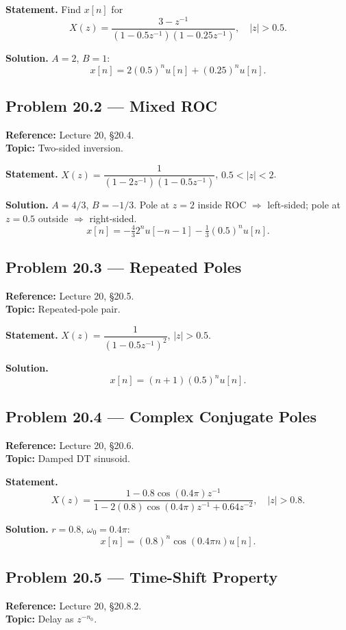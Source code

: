 \documentclass[11pt]{article}
\begin{document}
\textbf{Statement.} Find $x[n]$ for
\[
X(z) = \frac{3-z^{-1}}{(1-0.5z^{-1})(1-0.25z^{-1})},\quad |z|>0.5.
\]

\textbf{Solution.} $A=2$, $B=1$:
\[
\boxed{x[n] = 2(0.5)^n u[n] + (0.25)^n u[n]}.
\]

\subsection{Problem 20.2 --- Mixed ROC}
\textbf{Reference:} Lecture 20, \S 20.4.\\
\textbf{Topic:} Two-sided inversion.

\textbf{Statement.} $X(z) = \dfrac{1}{(1-2z^{-1})(1-0.5z^{-1})}$, $0.5<|z|<2$.

\textbf{Solution.} $A=4/3$, $B=-1/3$. Pole at $z=2$ inside ROC $\Rightarrow$ left-sided; pole at $z=0.5$ outside $\Rightarrow$ right-sided.
\[
\boxed{x[n] = -\tfrac{4}{3}2^n u[-n-1] - \tfrac{1}{3}(0.5)^n u[n]}.
\]

\subsection{Problem 20.3 --- Repeated Poles}
\textbf{Reference:} Lecture 20, \S 20.5.\\
\textbf{Topic:} Repeated-pole pair.

\textbf{Statement.} $X(z) = \dfrac{1}{(1-0.5z^{-1})^2}$, $|z|>0.5$.

\textbf{Solution.}
\[
\boxed{x[n] = (n+1)(0.5)^n u[n]}.
\]

\subsection{Problem 20.4 --- Complex Conjugate Poles}
\textbf{Reference:} Lecture 20, \S 20.6.\\
\textbf{Topic:} Damped DT sinusoid.

\textbf{Statement.}
\[
X(z) = \frac{1-0.8\cos(0.4\pi)z^{-1}}{1-2(0.8)\cos(0.4\pi)z^{-1}+0.64z^{-2}},\quad |z|>0.8.
\]

\textbf{Solution.} $r=0.8$, $\omega_0=0.4\pi$:
\[
\boxed{x[n] = (0.8)^n \cos(0.4\pi n) u[n]}.
\]

\subsection{Problem 20.5 --- Time-Shift Property}
\textbf{Reference:} Lecture 20, \S 20.8.2.\\
\textbf{Topic:} Delay as $z^{-n_0}$.
\end{document}
